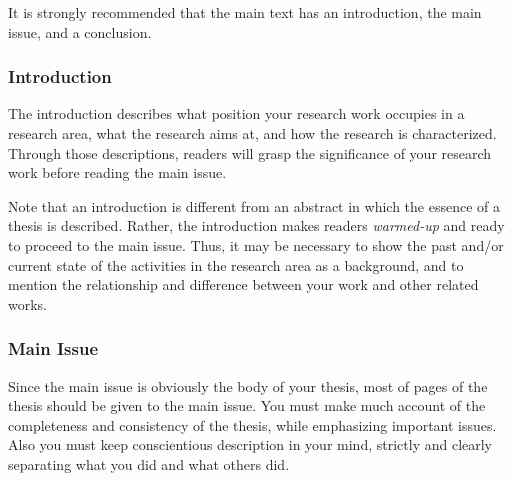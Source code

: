 It is strongly recommended that the main text has an introduction, the main
issue, and a conclusion.

\subsubsection{Introduction}\label{subsubsec-intro}
The introduction describes what position your research work occupies in a
research area, what the research aims at, and how the research is
characterized.   Through those descriptions, readers will grasp the
significance of your research work before reading the main issue.

Note that an introduction is different from an abstract in which the essence
of a thesis is described.  Rather, the introduction makes readers {\em
warmed-up} and ready to proceed to the main issue.  Thus, it may be
necessary to show the past and/or current state of the activities in the
research area as a background, and to mention the relationship and
difference between your work and other related works.

\subsubsection{Main Issue}\label{subsubsec-main}
Since the main issue is obviously the body of your thesis, most of pages of
the thesis should be given to the main issue.  You must make much account of
the completeness and consistency of the thesis, while emphasizing important
issues.  Also you must keep conscientious description in your mind, strictly
and clearly separating what you did and what others did.

